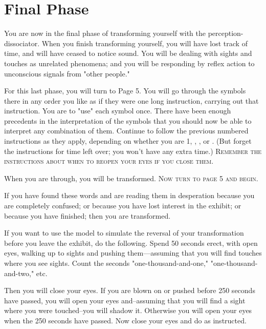 \clearpage
{}

\vfill
\section{Final Phase}

\vfill
You are now in the final phase of transforming yourself with the 
perception-dissociator. When you finish transforming yourself, you will have 
lost track of time, and will have ceased to notice sound. You will be dealing 
with sights and touches as unrelated phenomena; and you will be responding 
by reflex action to unconscious signals from "other people." 

For this last phase, you will turn to Page 5. You will go through the 
symbols there in any order you like as if they were one long instruction, 
carrying out that instruction. You are to "use" each symbol once. There 
have been enough precedents in the interpretation of the symbols that you 
should now be able to interpret any combination of them. Continue to 
follow the previous numbered instructions as they apply, depending on 
whether you are 1, , , or . 
(But forget the instructions for time left 
over; you won't have any extra time.) 
\textsc{Remember the instructions about when to reopen your eyes if you close them.}

When you are through, you will be transformed. 
\textsc{Now turn to page 5 and begin.}

\vfill

\clearpage
{}

\vfill

If you have found these words and are reading them in desperation 
because you are completely confused; or because you have lost interest in 
the exhibit; or because you have finished; then you are transformed. 


If you want to use the model to simulate the reversal of your 
transformation before you leave the exhibit, do the following. Spend 50 
seconds erect, with open eyes, walking up to sights and pushing 
them---assuming that you will find touches where you see sights. Count the 
seconds "one-thousand-and-one," "one-thousand-and-two," etc. 


Then you will close your eyes. If you are blown on or pushed before 
250 seconds have passed, you will open your eyes and--assuming that you 
will find a sight where you were touched--you will shadow it. Otherwise you 
will open your eyes when the 250 seconds have passed. Now close your eyes 
and do as instructed. 


